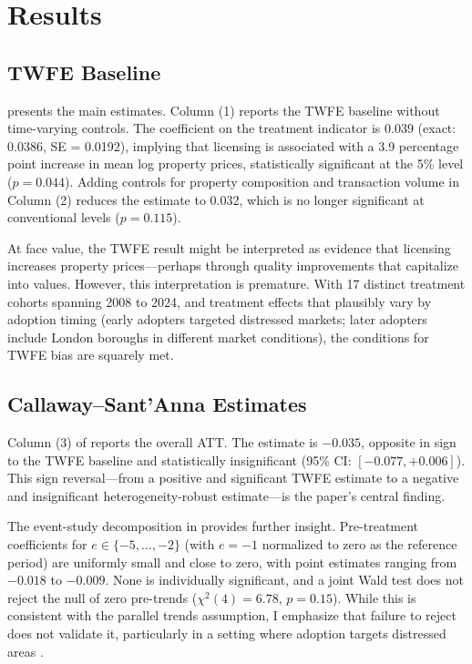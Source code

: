 \documentclass[12pt]{article}
\begin{document}
\section{Results}
\label{sec:results}

\subsection{TWFE Baseline}

 presents the main estimates. Column (1) reports the TWFE baseline without time-varying controls. The coefficient on the treatment indicator is 0.039 (exact: 0.0386, SE = 0.0192), implying that licensing is associated with a 3.9 percentage point increase in mean log property prices, statistically significant at the 5\% level ($p = 0.044$). Adding controls for property composition and transaction volume in Column (2) reduces the estimate to 0.032, which is no longer significant at conventional levels ($p = 0.115$).

At face value, the TWFE result might be interpreted as evidence that licensing increases property prices---perhaps through quality improvements that capitalize into values. However, this interpretation is premature. With 17 distinct treatment cohorts spanning 2008 to 2024, and treatment effects that plausibly vary by adoption timing (early adopters targeted distressed markets; later adopters include London boroughs in different market conditions), the conditions for TWFE bias are squarely met.

\subsection{Callaway--Sant'Anna Estimates}

Column (3) of  reports the \citet{callaway2021difference} overall ATT. The estimate is $-0.035$, opposite in sign to the TWFE baseline and statistically insignificant (95\% CI: $[-0.077, +0.006]$). This sign reversal---from a positive and significant TWFE estimate to a negative and insignificant heterogeneity-robust estimate---is the paper's central finding.

The event-study decomposition in  provides further insight. Pre-treatment coefficients for $e \in \{-5, \ldots, -2\}$ (with $e = -1$ normalized to zero as the reference period) are uniformly small and close to zero, with point estimates ranging from $-0.018$ to $-0.009$. None is individually significant, and a joint Wald test does not reject the null of zero pre-trends ($\chi^2(4) = 6.78$, $p = 0.15$). While this is consistent with the parallel trends assumption, I emphasize that failure to reject does not validate it, particularly in a setting where adoption targets distressed areas \citep{roth2022pretest}.
\end{document}
